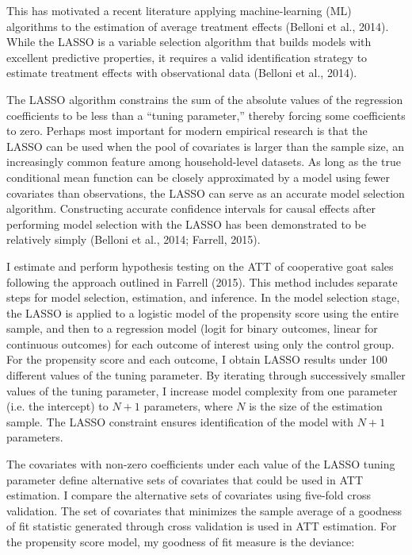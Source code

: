 \documentclass[11pt]{article}
\begin{document}
This has motivated a recent literature applying machine-learning (ML) algorithms to the estimation of average treatment effects (Belloni et al., 2014). While the LASSO is a variable selection algorithm that builds models with excellent predictive properties, it requires a valid identification strategy to estimate treatment effects with observational data (Belloni et al., 2014).

The LASSO algorithm constrains the sum of the absolute values of the regression coefficients to be less than a ``tuning parameter,'' thereby forcing some coefficients to zero. Perhaps most important for modern empirical research is that the LASSO can be used when the pool of covariates is larger than the sample size, an increasingly common feature among household-level datasets. As long as the true conditional mean function can be closely approximated by a model using fewer covariates than observations, the LASSO can serve as an accurate model selection algorithm. Constructing accurate confidence intervals for causal effects after performing model selection with the LASSO has been demonstrated to be relatively simply (Belloni et al., 2014; Farrell, 2015).

I estimate and perform hypothesis testing on the ATT of cooperative goat sales following the approach outlined in Farrell (2015). This method includes separate steps for model selection, estimation, and inference. In the model selection stage, the LASSO is applied to a logistic model of the propensity score using the entire sample, and then to a regression model (logit for binary outcomes, linear for continuous outcomes) for each outcome of interest using only the control group. For the propensity score and each outcome, I obtain LASSO results under 100 different values of the tuning parameter. By iterating through successively smaller values of the tuning parameter, I increase model complexity from one parameter (i.e. the intercept) to $N + 1$ parameters, where $N$ is the size of the estimation sample. The LASSO constraint ensures identification of the model with $N + 1$ parameters.

The covariates with non-zero coefficients under each value of the LASSO tuning parameter define alternative sets of covariates that could be used in ATT estimation. I compare the alternative sets of covariates using five-fold cross validation. The set of covariates that minimizes the sample average of a goodness of fit statistic generated through cross validation is used in ATT estimation. For the propensity score model, my goodness of fit measure is the deviance:
\end{document}
